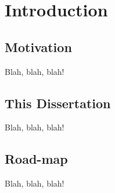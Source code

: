 \chapter{Introduction}

\section{Motivation}

Blah, blah, blah!

\section{This Dissertation}

Blah, blah, blah!

\section{Road-map}

Blah, blah, blah!
